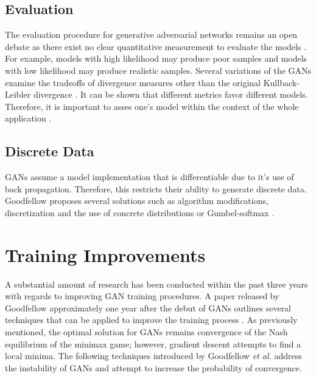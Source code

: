 \documentclass[11pt]{article}
\begin{document}
\subsection{Evaluation}
The evaluation procedure for generative adversarial networks remains an open debate as there exist no clear quantitative measurement to evaluate the models \citep{2017arXiv170100160G}. For example, models with high likelihood may produce poor samples and models with low likelihood may produce realistic samples. Several variations of the GANs examine the tradeoffs of divergence measures other than the original Kullback-Leibler divergence \citep{2015arXiv151101844T}. It can be shown that different metrics favor different models. Therefore, it is important to asses one's model within the context of the whole application \citep{2015arXiv151101844T}.

\subsection{Discrete Data}
GANs assume a model implementation that is differentiable due to it's use of back propagation. Therefore, this restricts their ability to generate discrete data. Goodfellow proposes several solutions such as algorithm modifications, discretization and the use of concrete distributions or Gumbel-softmax \citep{2017arXiv170100160G}.

\section{Training Improvements}
A substantial amount of research has been conducted within the past three years with regards to improving GAN training procedures. A paper released by Goodfellow approximately one year after the debut of GANs outlines several techniques that can be applied to improve the training process \citep{2016arXiv160603498S}. As previously mentioned, the optimal solution for GANs remains convergence of the Nash equilibrium of the minimax game; however, gradient descent attempts to find a local minima. The following techniques introduced by Goodfellow \textit{et al.} address the instability of GANs and attempt to increase the probability of convergence.
\end{document}
